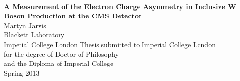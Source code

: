 \begin{titlepage}
\begin{center}
\vspace{5cm}
~
\\[2cm]
\Large{\textbf{A Measurement of the Electron Charge Asymmetry in Inclusive W Boson Production at the CMS Detector}}
\\[2cm]
\large{Martyn Jarvis}
\\[1cm]
\large{Blackett Laboratory\\Imperial College London}
\vfill
\normalsize{Thesis submitted to Imperial College London\\
       for the degree of Doctor of Philosophy\\
       and the Diploma of Imperial College}
\\[1cm]
\normalsize{Spring 2013}

\end{center}
\end{titlepage}

\cleardoublepage

